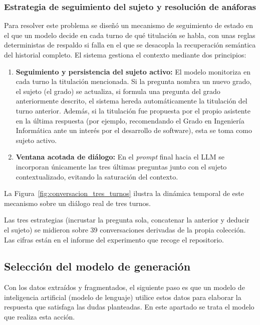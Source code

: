 \subsubsection{Estrategia de seguimiento del sujeto y resolución de anáforas}
\label{secc:fase2_gestion_contexto}

Para resolver este problema se diseñó un mecanismo de seguimiento de estado en el que un modelo decide en cada turno de qué titulación se habla, con unas reglas deterministas de respaldo si falla en el que se desacopla la recuperación semántica del historial completo. El sistema gestiona el contexto mediante dos principios:

\begin{enumerate}
  \item \textbf{Seguimiento y persistencia del sujeto activo:} El modelo monitoriza en cada turno la titulación mencionada. Si la pregunta nombra un nuevo grado, el sujeto (el grado) se actualiza, si formula una pregunta del grado anteriormente descrito, el sistema hereda automáticamente la titulación del turno anterior. Además, si la titulación fue propuesta por el propio asistente en la última respuesta (por ejemplo, recomendando el Grado en Ingeniería Informática ante un interés por el desarrollo de software), esta se toma como sujeto activo.
  \item \textbf{Ventana acotada de diálogo:} En el \textit{prompt} final hacia el LLM se incorporan únicamente las tres últimas preguntas junto con el sujeto contextualizado, evitando la saturación del contexto. 
\end{enumerate}

La Figura~\ref{fig:conversacion_tres_turnos} ilustra la dinámica temporal de este mecanismo sobre un diálogo real de tres turnos.


Las tres estrategias (incrustar la pregunta sola, concatenar la
  anterior y deducir el sujeto) se midieron sobre 39 conversaciones derivadas de la
  propia colección. Las cifras están en el informe del experimento que
  recoge el repositorio\cite{repo_tfg}. 

\subsection[Selección del modelo de generación]{Selección del modelo de generación}
\label{secc:fase2_llm}

  Con los datos extraídos y fragmentados, el siguiente paso es que un modelo de inteligencia artificial (modelo de lenguaje)
  utilice estos datos para elaborar la respuesta que satisfaga las dudas planteadas. En este apartado se trata el modelo que realiza esta acción.

